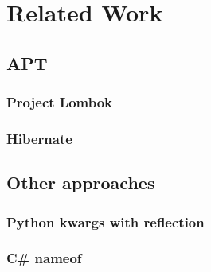 

\chapter{Related Work}
\section{APT}
\subsection{Project Lombok}
\subsection{Hibernate}
\section{Other approaches}
\subsection{Python kwargs with reflection}
\subsection{C\# nameof}

